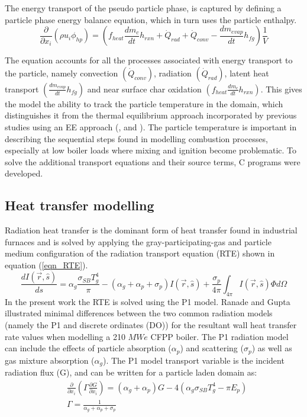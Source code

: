 \documentclass[review]{elsarticle}
\begin{document}
The energy transport of the pseudo particle phase, is captured by defining a particle phase energy balance equation, which in turn uses the particle enthalpy.
\begin{equation}\label{eqn_phi_hp}
\frac{\partial}{\partial x_{i}}(\rho u_{i} \phi_{hp})=\left(f_{heat}\frac{dm_{c}}{dt}h_{rxn} + \dot{Q}_{rad} + \dot{Q}_{conv} - \frac{dm_{evap}}{dt}h_{fg}\right)\frac{1}{V}
\end{equation}

The equation accounts for all the processes associated with energy transport to the particle, namely convection $\left(\dot{Q}_{conv}\right)$, radiation $\left(\dot{Q}_{rad}\right)$, latent heat transport $\left(\frac{dm_{evap}}{dt}h_{fg}\right)$ and near surface char oxidation $\left(f_{heat}\frac{dm_{c}}{dt}h_{rxn}\right)$. This gives the model the ability to track the particle temperature in the domain, which distinguishes it from the thermal equilibrium approach incorporated by previous studies using an EE approach (\cite{Benim2005}, \cite{Vicente2003} and \cite{Cai2015}). The particle temperature is important in describing the sequential steps found in modelling combustion processes, especially at low boiler loads where mixing and ignition become problematic. To solve the additional transport equations and their source terms, C programs were developed.

\subsection{Heat transfer modelling}
Radiation heat transfer is the dominant form of heat transfer found in industrial furnaces \citep{Basu2000} and is solved by applying the gray-participating-gas and particle medium configuration of the radiation transport equation (RTE) \cite{Modest2013} shown in equation (\ref{eqn_RTE}).
\begin{equation}\label{eqn_RTE}
\frac{d I(\vec{r},\hat{s})}{ds} = \alpha_g \frac{\sigma_{SB} T_{g}^4}{\pi}-(\alpha_g+\alpha_p+\sigma_p)I(\vec{r},\hat{s}) + \frac{\sigma_p}{4\pi}\int_{4\pi}I(\vec{r},\hat{s})\Phi d \Omega
\end{equation}
In the present work the RTE is solved using the P1 model. Ranade and Gupta \cite{Ranade2015} illustrated minimal differences between the two common radiation models (namely the P1 and discrete ordinates (DO)) for the resultant wall heat transfer rate values when modelling a 210 $MWe$ CFPP boiler. The P1 radiation model can include the effects of particle absorption ($\alpha_p$) and scattering ($\sigma_p$) as well as gas mixture absorption ($\alpha_g$). The P1 model transport variable is the incident radiation flux (G), and can be written for a particle laden domain as:
\begin{equation}
\begin{split}
&\frac{\partial}{\partial x_{i}}\left(\Gamma\frac{\partial G}{\partial x_{i}}\right)=\left(\alpha_g+\alpha_p\right)G-4\left(\alpha_g \sigma_{SB} T_{g}^4-\pi E_p \right)\\
&\Gamma = \frac{1}{\alpha_g+\alpha_p+\sigma_p}
\end{split}
\end{equation}
\end{document}
